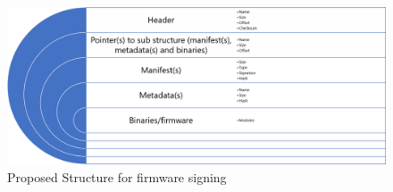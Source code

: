 \begin{figure}[htbp]
    \centering
    \includegraphics[width=\linewidth]{Im/figures/proposed-work/proposed-structure-firmware-signing}
    \caption{Proposed Structure for firmware signing}\label{fig:proposed-work-proposed-structure-firmware-signing}
\end{figure}